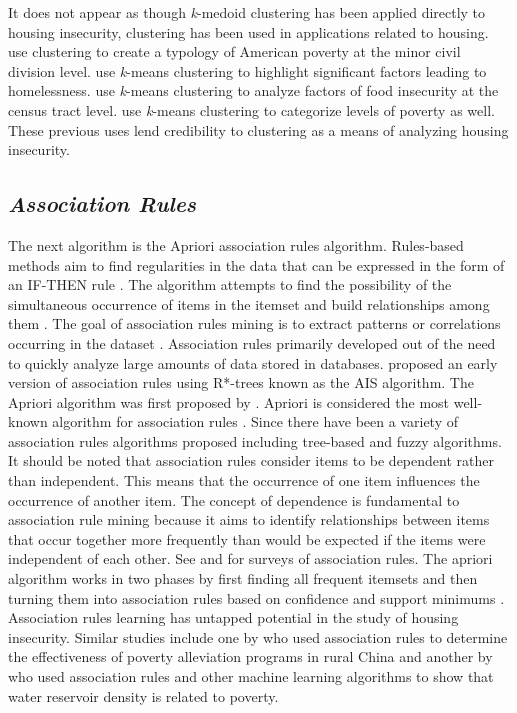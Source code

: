 It does not appear as though \textit{k}-medoid clustering has been applied directly to housing insecurity, clustering has been used in applications related to housing. \citet{peters_typology_2009} use clustering to create a typology of American poverty at the minor civil division level. \citet{yoder_clark_using_2021} use \textit{k}-means clustering to highlight significant factors leading to homelessness. \citet{borders_west_2018} use \textit{k}-means clustering to analyze factors of food insecurity at the census tract level. \citet{sarwosri_poverty_2016} use \textit{k}-means clustering to categorize levels of poverty as well. These previous uses lend credibility to clustering as a means of analyzing housing insecurity. 

\subsection{\textit{Association Rules}} 

 
The next algorithm is the Apriori association rules algorithm. Rules-based methods aim to find regularities in the data that can be expressed in the form of an IF-THEN rule \citep{bassiliades_brief_2015}. The algorithm attempts to find the possibility of the simultaneous occurrence of items in the itemset and build relationships among them \citep{chen_comparisons_2011}. The goal of association rules mining is to extract patterns or correlations occurring in the dataset \citep{zhao_association_2003}. Association rules primarily developed out of the need to quickly analyze large amounts of data stored in databases. \citet{goos_efficient_1993} proposed an early version of association rules using R*-trees known as the AIS algorithm. The Apriori algorithm was first proposed by \citet{agrawal_fast_1994}. Apriori is considered the most well-known algorithm for association rules \citep{dunham_mining_2000}. Since \citet{agrawal_fast_1994} there have been a variety of association rules algorithms proposed including tree-based and fuzzy algorithms. It should be noted that association rules consider items to be dependent rather than independent. This means that the occurrence of one item influences the occurrence of another item. The concept of dependence is fundamental to association rule mining because it aims to identify relationships between items that occur together more frequently than would be expected if the items were independent of each other. See \citet{solanki_survey_2015} and \citet{dunham_mining_2000} for surveys of association rules. The apriori algorithm works in two phases by first finding all frequent itemsets and then turning them into association rules based on confidence and support minimums \citep{bassiliades_brief_2015}. Association rules learning has untapped potential in the study of housing insecurity. Similar studies include one by \citet{zhen_poverty_2020} who used association rules to determine the effectiveness of poverty alleviation programs in rural China and another by \citet{tian_identifying_2020} who used association rules and other machine learning algorithms to show that water reservoir density is related to poverty. 

